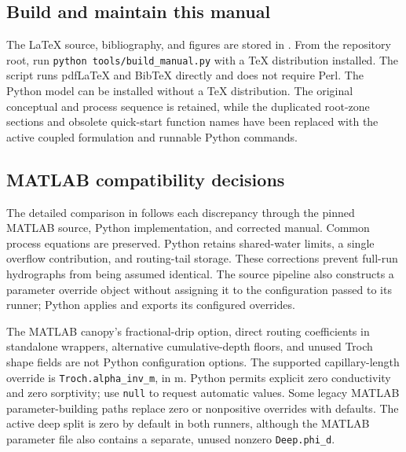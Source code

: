 \subsection{Build and maintain this manual}

The LaTeX source, bibliography, and figures are stored in . From the repository root, run \texttt{python tools/build\_manual.py} with a TeX distribution installed. The script runs pdfLaTeX and BibTeX directly and does not require Perl. The Python model can be installed without a TeX distribution. The original conceptual and process sequence is retained, while the duplicated root-zone sections and obsolete quick-start function names have been replaced with the active coupled formulation and runnable Python commands.

\subsection{MATLAB compatibility decisions}
The detailed comparison in  follows each discrepancy through the pinned MATLAB source, Python implementation, and corrected manual. Common process equations are preserved. Python retains shared-water limits, a single overflow contribution, and routing-tail storage. These corrections prevent full-run hydrographs from being assumed identical. The source pipeline also constructs a parameter override object without assigning it to the configuration passed to its runner; Python applies and exports its configured overrides.

The MATLAB canopy's fractional-drip option, direct routing coefficients in standalone wrappers, alternative cumulative-depth floors, and unused Troch shape fields are not Python configuration options. The supported capillary-length override is \texttt{Troch.alpha\_inv\_m}, in m. Python permits explicit zero conductivity and zero sorptivity; use \texttt{null} to request automatic values. Some legacy MATLAB parameter-building paths replace zero or nonpositive overrides with defaults. The active deep split is zero by default in both runners, although the MATLAB parameter file also contains a separate, unused nonzero \texttt{Deep.phi\_d}.
